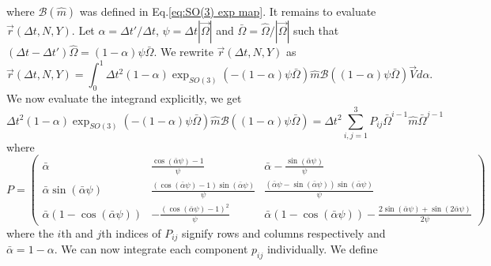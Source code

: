 \documentclass[]{cam-thesis}
\begin{document}
where $\mathscr{B}(\hat{m})$ was defined in Eq.\ref{eq:SO(3) exp map}. It remains to evaluate $\vec{r}(\Delta t, N, Y)$. Let $\alpha = \Delta t' / \Delta t$, $\psi = \Delta t |\vec{\Omega}|$ and $\bar{\Omega} = \hat{\Omega} /|\vec{\Omega}|$ such that $(\Delta t - \Delta t') \hat{\Omega} = (1- \alpha) \psi \bar{\Omega}$. We rewrite $\vec{r}(\Delta t, N, Y)$ as
\begin{equation}
	\vec{r} (\Delta t, N, Y) = \int_0^1 \Delta t^2 (1-\alpha) \exp_{SO(3)}( - (1-\alpha) \psi \bar{\Omega}) \hat{m} \mathscr{B}((1-\alpha) \psi \bar{\Omega}) \vec{V} d \alpha.
\end{equation}
We now evaluate the integrand explicitly, we get
\begin{equation} \label{eq:SE(3) propagator calc 1}
	\Delta t^2 (1-\alpha) \exp_{SO(3)}( - (1-\alpha) \psi \bar{\Omega}) \hat{m} \mathscr{B}((1-\alpha) \psi \bar{\Omega})  = \Delta t^2 \sum_{i,j=1}^{3} P_{ij} \bar{\Omega}^{i-1} \hat{m} \bar{\Omega}^{j-1}
\end{equation}
where
\small
\begin{equation}
P = \begin{pmatrix}
\bar{\alpha} & \frac{\cos{\left(\bar{\alpha} \psi \right)} - 1}{\psi} & \bar{\alpha} - \frac{\sin{\left(\bar{\alpha} \psi \right)}}{\psi}\\\bar{\alpha} \sin{\left(\bar{\alpha} \psi \right)} & \frac{\left(\cos{\left(\bar{\alpha} \psi \right)} - 1\right) \sin{\left(\bar{\alpha} \psi \right)}}{\psi} & \frac{\left(\bar{\alpha} \psi - \sin{\left(\bar{\alpha} \psi \right)}\right) \sin{\left(\bar{\alpha} \psi \right)}}{\psi}\\\bar{\alpha} \left(1 - \cos{\left(\bar{\alpha} \psi \right)}\right) & - \frac{\left(\cos{\left(\bar{\alpha} \psi \right)} - 1\right)^{2}}{\psi} & 
\bar{\alpha} ( 1 - \cos{\left(\bar{\alpha} \psi \right)}) - 
\frac{ 2\sin{\left(\bar{\alpha} \psi \right)} + \sin{\left(2 \bar{\alpha} \psi \right)} }{2 \psi} 
\end{pmatrix}
\end{equation}
\normalsize
where the $i$th and $j$th indices of $P_{ij}$ signify rows and columns respectively and $\bar{\alpha} = 1 - \alpha$. We can now integrate each component $p_{ij}$ individually. We define
\footnotesize
\end{document}
